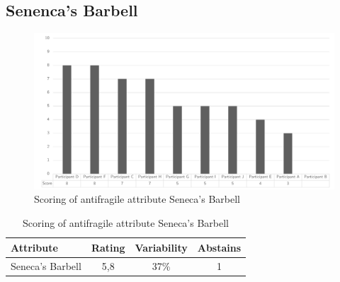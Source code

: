 \subsection{Senenca's Barbell}
\begin{figure}[h!]
	\centering
	\includegraphics[width=0.9\linewidth]{images/scoreafseneca}
	\caption[Scoring of antifragile attribute Seneca's Barbell]{Scoring of antifragile attribute Seneca's Barbell}
	\label{fig:appscoringafseneca}
\end{figure}
\begin{table}[h!]
	\centering
	\begin{tabular}{p{}ccc}
		\toprule
		\textbf{Attribute} & \textbf{Rating} & \textbf{Variability} & \textbf{Abstains} \\
		\midrule
		Seneca's Barbell & 5,8 & 37\% & 1 \\%
		\bottomrule
	\end{tabular}%
	\caption[Scoring of antifragile attribute Seneca's Barbell]{Scoring of antifragile attribute Seneca's Barbell}
	\label{tab:appscoringafseneca}%
\end{table}%
\newpage
